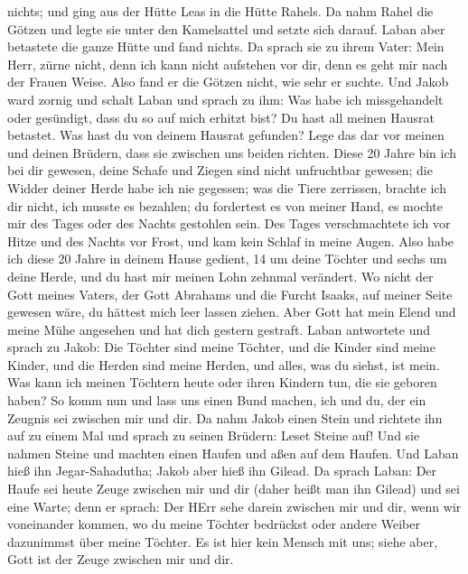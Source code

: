 nichts; und ging aus der Hütte Leas in die Hütte Rahels. 
Da nahm Rahel die Götzen und legte sie unter den Kamelsattel und setzte
sich darauf. Laban aber betastete die ganze Hütte und fand nichts.
 Da sprach sie zu ihrem Vater: Mein Herr, zürne nicht, denn
ich kann nicht aufstehen vor dir, denn es geht mir nach der Frauen
Weise. Also fand er die Götzen nicht, wie sehr er suchte. 
Und Jakob ward zornig und schalt Laban und sprach zu ihm: Was habe ich
missgehandelt oder gesündigt, dass du so auf mich erhitzt bist?
 Du hast all meinen Hausrat betastet. Was hast du von
deinem Hausrat gefunden? Lege das dar vor meinen und deinen Brüdern,
dass sie zwischen uns beiden richten.  Diese 20 Jahre bin
ich bei dir gewesen, deine Schafe und Ziegen sind nicht unfruchtbar
gewesen; die Widder deiner Herde habe ich nie gegessen; 
was die Tiere zerrissen, brachte ich dir nicht, ich musste es bezahlen;
du fordertest es von meiner Hand, es mochte mir des Tages oder des
Nachts gestohlen sein.  Des Tages verschmachtete ich vor
Hitze und des Nachts vor Frost, und kam kein Schlaf in meine Augen.
 Also habe ich diese 20 Jahre in deinem Hause gedient, 14
um deine Töchter und sechs um deine Herde, und du hast mir meinen Lohn
zehnmal verändert.  Wo nicht der Gott meines Vaters, der
Gott Abrahams und die Furcht Isaaks, auf meiner Seite gewesen wäre, du
hättest mich leer lassen ziehen. Aber Gott hat mein Elend und meine Mühe
angesehen und hat dich gestern gestraft.  Laban antwortete
und sprach zu Jakob: Die Töchter sind meine Töchter, und die Kinder sind
meine Kinder, und die Herden sind meine Herden, und alles, was du
siehst, ist mein. Was kann ich meinen Töchtern heute oder ihren Kindern
tun, die sie geboren haben?  So komm nun und lass uns einen
Bund machen, ich und du, der ein Zeugnis sei zwischen mir und dir.
 Da nahm Jakob einen Stein und richtete ihn auf zu einem
Mal  und sprach zu seinen Brüdern: Leset Steine auf! Und
sie nahmen Steine und machten einen Haufen und aßen auf dem Haufen.
 Und Laban hieß ihn Jegar-Sahadutha; Jakob aber hieß ihn
Gilead.  Da sprach Laban: Der Haufe sei heute Zeuge
zwischen mir und dir (daher heißt man ihn Gilead)  und sei
eine Warte; denn er sprach: Der HErr sehe darein zwischen mir und dir,
wenn wir voneinander kommen,  wo du meine Töchter bedrückst
oder andere Weiber dazunimmst über meine Töchter. Es ist hier kein
Mensch mit uns; siehe aber, Gott ist der Zeuge zwischen mir und dir.
